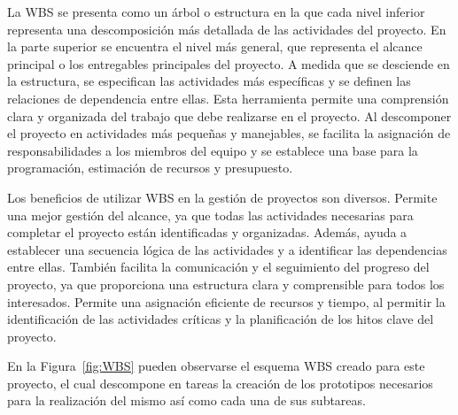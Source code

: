 La WBS se presenta como un árbol o estructura en la que cada nivel inferior representa una descomposición más detallada de las actividades del proyecto. En la parte superior se encuentra el nivel más general, que representa el alcance principal o los entregables principales del proyecto. A medida que se desciende en la estructura, se especifican las actividades más específicas y se definen las relaciones de dependencia entre ellas. Esta herramienta permite una comprensión clara y organizada del trabajo que debe realizarse en el proyecto. Al descomponer el proyecto en actividades más pequeñas y manejables, se facilita la asignación de responsabilidades a los miembros del equipo y se establece una base para la programación, estimación de recursos y presupuesto.

Los beneficios de utilizar WBS en la gestión de proyectos son diversos. Permite una mejor gestión del alcance, ya que todas las actividades necesarias para completar el proyecto están identificadas y organizadas. Además, ayuda a establecer una secuencia lógica de las actividades y a identificar las dependencias entre ellas. También facilita la comunicación y el seguimiento del progreso del proyecto, ya que proporciona una estructura clara y comprensible para todos los interesados. Permite una asignación eficiente de recursos y tiempo, al permitir la identificación de las actividades críticas y la planificación de los hitos clave del proyecto.

En la Figura~\ref{fig:WBS} pueden observarse el esquema WBS creado para este proyecto, el cual descompone en tareas la creación de los prototipos necesarios para la realización del mismo así como cada una de sus subtareas.

